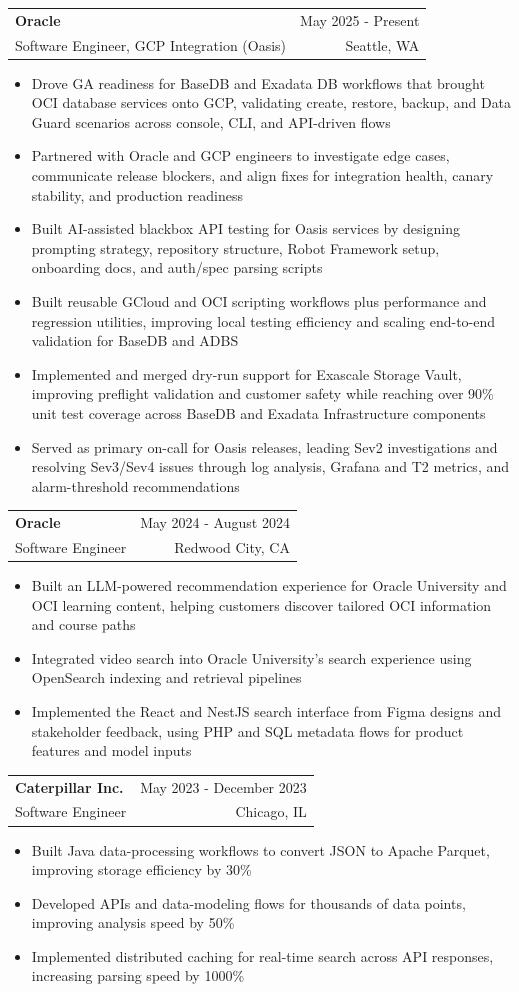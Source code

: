 \documentclass[letterpaper,11pt]{article}
\makeatletter
\newcommand{\resumeItem}[1]{
  \item\small{
    {#1 \vspace{-1pt}}
  }
}
\newcommand{\resumeSubheading}[4]{
  \vspace{-2pt}\item
    \begin{tabular*}{0.97\textwidth}[t]{l@{\extracolsep{\fill}}r}
      \textbf{#1} & #2 \\
      {\small#3} & {\small #4} \\
    \end{tabular*}\vspace{-7pt}
}
\newcommand{\resumeItemListStart}{\begin{itemize}[leftmargin=0.18in,itemsep=1pt,topsep=2pt]}
\newcommand{\resumeItemListEnd}{\end{itemize}\vspace{-5pt}}
\makeatother
\begin{document}
    \resumeSubheading
  {Oracle}{May 2025 - Present}
  {Software Engineer, GCP Integration (Oasis)}{Seattle, WA}
  \resumeItemListStart
    \resumeItem{Drove GA readiness for BaseDB and Exadata DB workflows that brought OCI database services onto GCP, validating create, restore, backup, and Data Guard scenarios across console, CLI, and API-driven flows}
    \resumeItem{Partnered with Oracle and GCP engineers to investigate edge cases, communicate release blockers, and align fixes for integration health, canary stability, and production readiness}
    \resumeItem{Built AI-assisted blackbox API testing for Oasis services by designing prompting strategy, repository structure, Robot Framework setup, onboarding docs, and auth/spec parsing scripts}
    \resumeItem{Built reusable GCloud and OCI scripting workflows plus performance and regression utilities, improving local testing efficiency and scaling end-to-end validation for BaseDB and ADBS}
    \resumeItem{Implemented and merged dry-run support for Exascale Storage Vault, improving preflight validation and customer safety while reaching over 90\% unit test coverage across BaseDB and Exadata Infrastructure components}
    \resumeItem{Served as primary on-call for Oasis releases, leading Sev2 investigations and resolving Sev3/Sev4 issues through log analysis, Grafana and T2 metrics, and alarm-threshold recommendations}
  \resumeItemListEnd

    \resumeSubheading
      {Oracle}{May 2024 - August 2024}
      {Software Engineer}{Redwood City, CA}
      \resumeItemListStart
        \resumeItem{Built an LLM-powered recommendation experience for Oracle University and OCI learning content, helping customers discover tailored OCI information and course paths}
        \resumeItem{Integrated video search into Oracle University's search experience using OpenSearch indexing and retrieval pipelines}
        \resumeItem{Implemented the React and NestJS search interface from Figma designs and stakeholder feedback, using PHP and SQL metadata flows for product features and model inputs}
      \resumeItemListEnd

    \resumeSubheading
      {Caterpillar Inc.}{May 2023 - December 2023}
      {Software Engineer}{Chicago, IL}
      \resumeItemListStart
        \resumeItem{Built Java data-processing workflows to convert JSON to Apache Parquet, improving storage efficiency by 30\%}
        \resumeItem{Developed APIs and data-modeling flows for thousands of data points, improving analysis speed by 50\%}
        \resumeItem{Implemented distributed caching for real-time search across API responses, increasing parsing speed by 1000\%}
      \resumeItemListEnd
\end{document}
